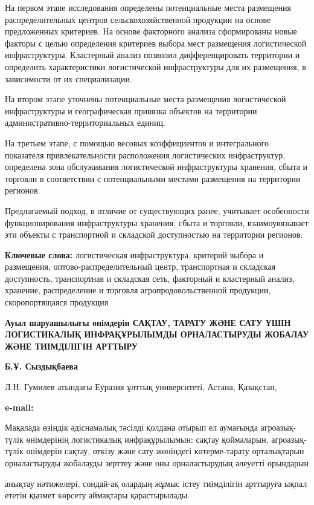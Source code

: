 На первом этапе исследования определены потенциальные места размещения
распределительных центров сельскохозяйственной продукции на основе
предложенных критериев. На основе факторного анализа сформированы новые
факторы с целью определения критериев выбора мест размещения
логистической инфраструктуры. Кластерный анализ позволил
дифференцировать территории и определить характеристики логистической
инфраструктуры для их размещения, в зависимости от их специализации.

На втором этапе уточнены потенциальные места размещения логистической
инфраструктуры и географическая привязка объектов на территории
административно-территориальных единиц.

На третьем этапе, с помощью весовых коэффициентов и интегрального
показателя привлекательности расположения логистических инфраструктур,
определена зона обслуживания логистической инфраструктуры хранения,
сбыта и торговли в соответствии с потенциальными местами размещения на
территории регионов.

Предлагаемый подход, в отличие от существующих ранее, учитывает
особенности функционирования инфраструктуры хранения, сбыта и торговли,
взаимоувязывает эти объекты с транспортной и складской доступностью на
территории регионов.

{\bfseries Ключевые слова:} логистическая инфраструктура, критерий выбора и
размещения, оптово-распределительный центр, транспортная и складская
доступность, транспортная и складская сеть, факторный и кластерный
анализ, хранение, распределение и торговля агропродовольственной
продукции, скоропортящаяся продукция

{\bfseries Ауыл шаруашылығы өнімдерін САҚТАУ, ТАРАТУ ЖӘНЕ САТУ ҮШІН
ЛОГИСТИКАЛЫҚ ИНФРАҚҰРЫЛЫМДЫ ОРНАЛАСТЫРУДЫ ЖОБАЛАУ ЖӘНЕ ТИІМДІЛІГІН
АРТТЫРУ}

{\bfseries Б.Ұ. Сыздықбаева}

Л.Н. Гумилев атындағы Еуразия ұлттық университеті, Астана, Қазақстан,

{\bfseries e-mail:}
\href{mailto:bakyt_syzdykbaeva@mail.ru}{}

Мақалада өзіндік әдіснамалық тәсілді қолдана отырып ел аумағында
агроазық-түлік өнімдерінің логистикалық инфрақұрылымын: сақтау
қоймаларын, агроазық-түлік өнімдерін сақтау, өткізу және сату жөніндегі
көтерме-тарату орталықтарын орналастыруды жобалауды зерттеу және оны
орналастырудың әлеуетті орындарын

анықтау нәтижелері, сондай-ақ олардың жұмыс істеу тиімділігін арттыруға
ықпал ететін қызмет көрсету аймақтары қарастырылады.


